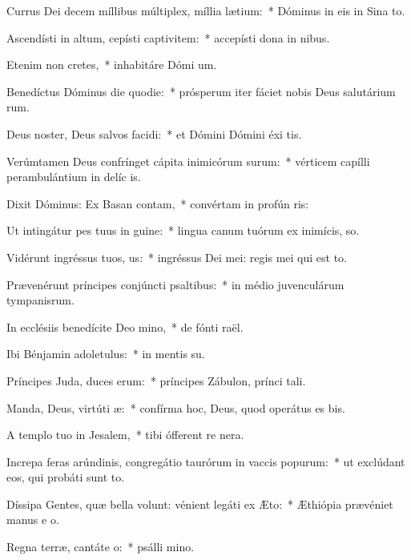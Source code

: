 \item Currus Dei decem míllibus múltiplex, míllia lætium:~* Dóminus in eis in Sina  to.
\item Ascendísti in altum, cepísti captivitem:~* accepísti dona in nibus.
\item Etenim non cretes,~* inhabitáre Dómi um.
\item Benedíctus Dóminus die quodie:~* prósperum iter fáciet nobis Deus salutárium rum.
\item Deus noster, Deus salvos facidi:~* et Dómini Dómini éxi tis.
\item Verúmtamen Deus confrínget cápita inimicórum surum:~* vérticem capílli perambulántium in delíc is.
\item Dixit Dóminus: Ex Basan contam,~* convértam in profún ris:
\item Ut intingátur pes tuus in guine:~* lingua canum tuórum ex inimícis,  so.
\item Vidérunt ingréssus tuos, us:~* ingréssus Dei mei: regis mei qui est  to.
\item Prævenérunt príncipes conjúncti psaltibus:~* in médio juvenculárum tympanisrum.
\item In ecclésiis benedícite Deo mino,~* de fónti raël.
\item Ibi Bénjamin adoletulus:~* in mentis su.
\item Príncipes Juda, duces erum:~* príncipes Zábulon, prínci tali.
\item Manda, Deus, virtúti æ:~* confírma hoc, Deus, quod operátus es  bis.
\item A templo tuo in Jesalem,~* tibi ófferent re nera.
\item Increpa feras arúndinis, congregátio taurórum in vaccis popurum:~* ut exclúdant eos, qui probáti sunt to.
\item Díssipa Gentes, quæ bella volunt: vénient legáti ex Æto:~* Æthiópia prævéniet manus e o.
\item Regna terræ, cantáte o:~* psálli mino.
